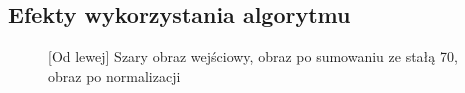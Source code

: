 \documentclass[a4paper,12pt, titlepage]{report}
\begin{document}
\subsection*{Efekty wykorzystania algorytmu}
\begin{figure}[h]
    \centering
    \caption{[Od lewej] Szary obraz wejściowy, obraz po sumowaniu ze stałą 70, obraz po normalizacji}%
    \label{fig:rysunek}%
\end{figure}
\FloatBarrier
\end{document}
